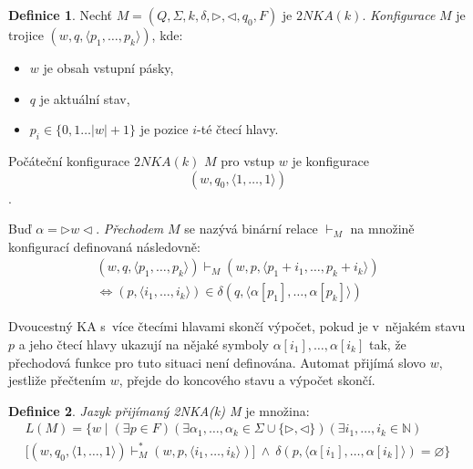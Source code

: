 \documentclass[thesis=B,czech]{FITthesis}[2019/12/23]
\theoremstyle{definition}
\newtheorem{definition}{Definice}[chapter]
\begin{document}
\begin{definition}
Nechť $M = \left(Q, \Sigma, k, \delta, \triangleright, \triangleleft, q_0, F\right)$ je $2NKA(k)$.
\emph{Konfigurace} $M$ je trojice $\left(w, q, \langle p_1, \dots, p_k\rangle\right)$, kde:
\begin{itemize}
	\item{$w$ je obsah vstupní pásky,}
	\item{$q$ je aktuální stav,}
	\item{$p_i \in \{0, 1 \dots |w|+1\}$ je pozice $i$-té čtecí hlavy.}
\end{itemize}

Počáteční konfigurace $2NKA(k)$ $M$ pro vstup $w$ je konfigurace $$\left(w, q_0, \langle 1, \dots, 1\rangle\right)$$.

Buď $\alpha = \triangleright w \triangleleft$. \emph{Přechodem} $M$ se nazývá binární relace $\vdash_M$ na množině konfigurací definovaná následovně:
\begin{equation*}
\begin{split}
\left(w, q, \langle p_1, \dots, p_k \rangle\right) \vdash_M
\left(w, p,  \langle p_1+i_1, \dots, p_k+i_k \rangle \right) \\
\iff \left(p, \langle i_1, \dots, i_k \rangle \right) \in \delta\left(q, \langle \alpha[p_1], \dots, \alpha[p_k] \rangle \right)
\end{split}
\end{equation*}
\end{definition}

Dvoucestný KA s~více čtecími hlavami skončí výpočet, pokud je v~nějakém stavu $p$ a jeho čtecí hlavy ukazují na nějaké symboly $\alpha[i_1], \dots, \alpha[i_k]$ tak, že přechodová funkce pro tuto situaci není definována. Automat přijímá slovo $w$, jestliže přečtením $w$, přejde do koncového stavu a výpočet skončí.

\begin{definition}
\emph{Jazyk přijímaný 2NKA(k) M} je množina: 
\begin{equation*}
	\begin{split}
L\left(M\right) = \{ w \mid \left(\exists p \in F \right)  \left(\exists \alpha_1,\dots, \alpha_{k} \in \Sigma\cup\{\triangleright, \triangleleft\} \right) \left(\exists i_1, \dots, i_{k} \in \mathbb{N} \right) \\ 
\Big [ \left(w, q_0, \langle1, \dots, 1\rangle\right) \vdash_M^{\ast} \left(w, p, \langle i_1, \dots, i_k\rangle \right) \Big ] \ \wedge \ \delta(p, \langle \alpha[i_1], \dots, \alpha[i_k] \rangle) = \varnothing \}
\end{split}
\end{equation*}
\end{definition}
\end{document}
